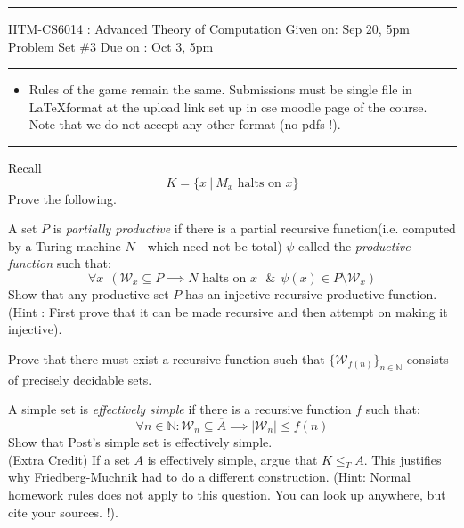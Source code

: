 \documentclass[addpoints,12pt]{exam}
\renewcommand{\W}{\mathcal{W}}
\begin{document}
\hrule
\vspace{3mm}
\noindent
{\sf IITM-CS6014 : Advanced Theory of Computation  \hfill Given on: Sep 20, 5pm}
\vspace{3mm}\\
\noindent
{\sf Problem Set \#3 \hfill Due on : Oct 3, 5pm}
\vspace{3mm}
\hrule
{\small
\begin{itemize}
\item Rules of the game remain the same. Submissions must be single file in \LaTeX format at the upload link set up in cse moodle page of the course. Note that we do not accept any other format (no pdfs !).
\end{itemize}}
\hrule

\begin{questions}
\question[10]
Recall
\[ K = \{ x~|~M_x \text{ halts on } x\}\] Prove the following.

\question[10] A set $P$ is \textit{partially productive} if there is a partial recursive function(i.e. computed by a Turing machine $N$ - which need not be total) $\psi$ called the {\em productive function} such that:
\[ \forall x ~~\left( \mathcal{W}_x \subseteq P \implies N \textrm{ halts on $x$ } 
\&~~\psi(x) \in P \setminus \mathcal{W}_x \right) \]
Show that any productive set $P$ has an injective recursive productive function. \\ (Hint : First prove that it can be made recursive and then attempt on making it injective).

\question[5]
Prove that there must exist a recursive function such that $\{ \W_{f(n)} \}_{n \in \mathbb{N}}$ consists of precisely decidable sets.

\question[5]
A simple set is {\em effectively simple} if there is a recursive function $f$ such that:
\[ \forall n\in \mathbb{N} : \W_n \subseteq \overline{A} \implies |\W_n| \le f(n) \]
Show that Post's simple set is effectively simple. \\[2mm]
(Extra Credit) If a set $A$ is effectively simple, argue that $K \le_T A$. This justifies why Friedberg-Muchnik had to do a different construction. 
(Hint: Normal homework rules does not apply to this question. You can look up anywhere, but cite your sources. !).


\end{questions}
\end{document}
